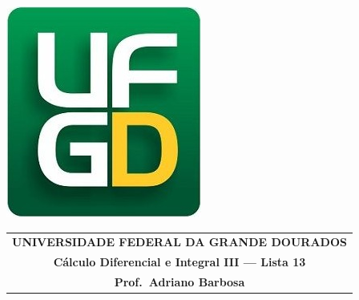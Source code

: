 \documentclass[a4paper,5pt]{amsbook}
\begin{document}
\thispagestyle{empty}
\pagestyle{empty}
\begin{minipage}[h]{0.14\textwidth}
	\includegraphics[scale=0.24]{../../ufgd.png}
\end{minipage}
\begin{minipage}[h]{\textwidth}
\begin{tabular}{c}
{{\bf UNIVERSIDADE FEDERAL DA GRANDE DOURADOS}}\\
{{\bf C\'alculo Diferencial e Integral III --- Lista 13}}\\
{{\bf Prof.\ Adriano Barbosa}}\\
\end{tabular}
\vspace{-0.45cm}
%
\end{minipage}

\end{document}
